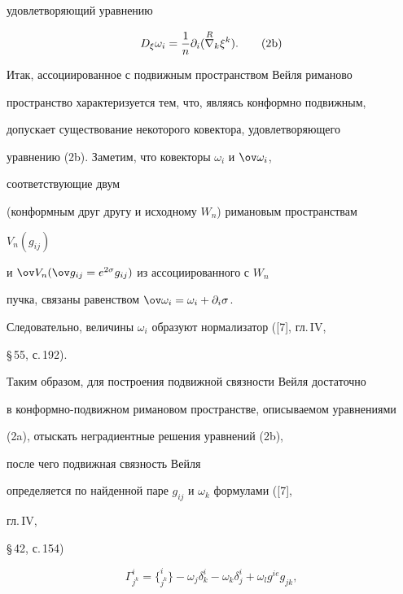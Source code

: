 удовлетворяющий уравнению 


\begin{equation} 


D_\xi\omega_i=\frac{1}{n}\partial_i 


(\up{R}{\nabla}_k\xi^k).\tag{2b} 


\end{equation} 


 


Итак, ассоциированное с подвижным пространством Вейля риманово 


пространство характеризуется тем, что, являясь конформно подвижным, 


допускает существование некоторого ковектора, удовлетворяющего 


уравнению (2b). Заметим, что ковекторы $\omega_i$ и $\ov\omega_i$, 


соответствующие двум 


(конформным друг другу и исходному $W_n$) римановым пространствам 


$V_n(g_{ij})$ 


и $\ov V_n(\ov g_{ij}=e^{2\sigma}g_{ij})$ из ассоциированного с $W_n$ 


пучка, связаны равенством $\ov\omega_i=\omega_i+\partial_i\sigma$. 


Следовательно, величины $\omega_i$ образуют нормализатор ([7], гл.\,IV, 


\S\,55, с.\,192). 


 


Таким образом, для построения подвижной связности Вейля достаточно 


в конформно-подвижном римановом пространстве, описываемом уравнениями 


(2a), отыскать неградиентные решения уравнений (2b), 


после чего подвижная связность Вейля 


определяется по найденной паре $g_{ij}$ и $\omega_k$ формулами ([7], 


гл.\,IV, 


\S\,42, с.\,154) 


\begin{equation} 


\Gamma^i_{j^k}=\{^i_{j^k}\}-\omega_j\delta^i_k- 


\omega_k\delta^i_j+\omega_l g^{ie}g_{jk}, 


\end{equation} 


